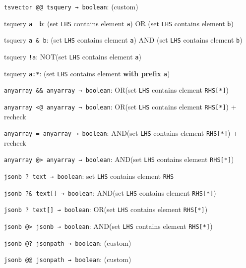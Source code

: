 \documentclass[11pt]{article}
\begin{document}
\begin{oparts}
\item
  \texttt{tsvector\ @@\ tsquery\ →\ boolean}: (custom)

  \begin{oparts}
  \item
    tsquery \texttt{a\ \textbar{}\ b}: (set \texttt{LHS} contains
    element \texttt{a}) OR (set \texttt{LHS} contains element
    \texttt{b})
  \item
    tsquery \texttt{a\ \&\ b}: (set \texttt{LHS} contains element
    \texttt{a}) AND (set \texttt{LHS} contains element \texttt{b})
  \item
    tsquery \texttt{!a}: NOT(set \texttt{LHS} contains element
    \texttt{a})
  \item
    tsquery \texttt{a:*\textquotesingle{}}: (set \texttt{LHS} contains
    element \textbf{with prefix} \texttt{a})
  \end{oparts}
\item
  \texttt{anyarray\ \&\&\ anyarray\ →\ boolean}: OR(set \texttt{LHS}
  contains element \texttt{RHS{[}*{]}})
\item
  \texttt{anyarray\ \textless{}@\ anyarray\ →\ boolean}: OR(set
  \texttt{LHS} contains element \texttt{RHS{[}*{]}}) + recheck
\item
  \texttt{anyarray\ =\ anyarray\ →\ boolean}: AND(set \texttt{LHS}
  contains element \texttt{RHS{[}*{]}}) + recheck
\item
  \texttt{anyarray\ @\textgreater{}\ anyarray\ →\ boolean}: AND(set
  \texttt{LHS} contains element \texttt{RHS{[}*{]}})
\item
  \texttt{jsonb\ ?\ text\ →\ boolean}: set \texttt{LHS} contains element
  \texttt{RHS}
\item
  \texttt{jsonb\ ?\&\ text{[}{]}\ →\ boolean}: AND(set \texttt{LHS}
  contains element \texttt{RHS{[}*{]}})
\item
  \texttt{jsonb\ ?\textbar{}\ text{[}{]}\ →\ boolean}: OR(set
  \texttt{LHS} contains element \texttt{RHS{[}*{]}})
\item
  \texttt{jsonb\ @\textgreater{}\ jsonb\ →\ boolean}: AND(set
  \texttt{LHS} contains element \texttt{RHS{[}*{]}})
\item
  \texttt{jsonb\ @?\ jsonpath\ →\ boolean}: (custom)
\item
  \texttt{jsonb\ @@\ jsonpath\ →\ boolean}: (custom)


\end{oparts}
\end{document}
